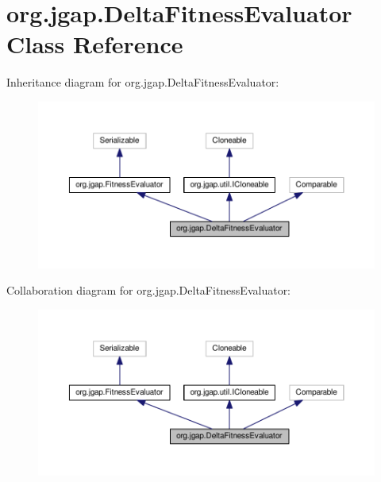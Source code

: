 \hypertarget{classorg_1_1jgap_1_1_delta_fitness_evaluator}{\section{org.\-jgap.\-Delta\-Fitness\-Evaluator Class Reference}
\label{classorg_1_1jgap_1_1_delta_fitness_evaluator}
}


Inheritance diagram for org.\-jgap.\-Delta\-Fitness\-Evaluator\-:
\nopagebreak
\begin{figure}[H]
\begin{center}
\leavevmode
\includegraphics[width=350pt]{classorg_1_1jgap_1_1_delta_fitness_evaluator__inherit__graph}
\end{center}
\end{figure}


Collaboration diagram for org.\-jgap.\-Delta\-Fitness\-Evaluator\-:
\nopagebreak
\begin{figure}[H]
\begin{center}
\leavevmode
\includegraphics[width=350pt]{classorg_1_1jgap_1_1_delta_fitness_evaluator__coll__graph}
\end{center}
\end{figure}
